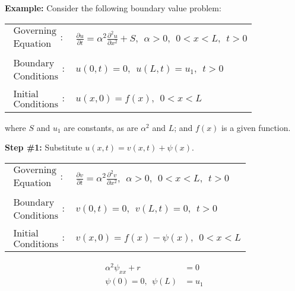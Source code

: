 \vspace{0.25cm}

\noindent\textbf{Example:}  Consider the following boundary value problem:
\begin{table}
\begin{tabular}{l l}
$\substack{\text{Governing} \\\text{Equation}}: $& $\frac{\partial u}{\partial t} = \alpha^2 \frac{\partial^2 u}{\partial x^2} + S, \ \ \alpha>0, \ \ 0<x<L, \ \ t>0$ \\
& \\
$\substack{\text{Boundary} \\ \text{Conditions}}: $& $u(0,t)=0, \ \ u(L,t) = u_1, \ \ t>0$\\
& \\
$\substack{\text{Initial} \\ \text{Conditions}}: $ & $u(x,0) = f(x), \ \ 0<x<L $ \\
\end{tabular}
\end{table}

\noindent where $S$ and $u_1$ are constants, as are $\alpha^2$ and $L$; and $f(x)$ is a given function.

\vspace{0.25cm}

\noindent\textbf{Step \#1:} Substitute $u(x,t) = v(x,t) + \psi(x)$.
\begin{table}[h!]
\begin{tabular}{l l}
$\substack{\text{Governing} \\\text{Equation}}: $& $\frac{\partial v}{\partial t} = \alpha^2 \frac{\partial^2 v}{\partial x^2}, \ \ \alpha>0, \ \ 0<x<L, \ \ t>0$ \\
& \\
$\substack{\text{Boundary} \\ \text{Conditions}}: $& $v(0,t)=0, \ \ v(L,t) = 0, \ \ t>0$\\
& \\
$\substack{\text{Initial} \\ \text{Conditions}}: $ & $v(x,0) = f(x)-\psi(x), \ \ 0<x<L $ \\
\end{tabular}
\end{table}

\begin{align*}
\alpha^2 \psi_{xx} + r &= 0 \\
\psi(0) = 0, \ \ \psi(L) &= u_1
\end{align*}

